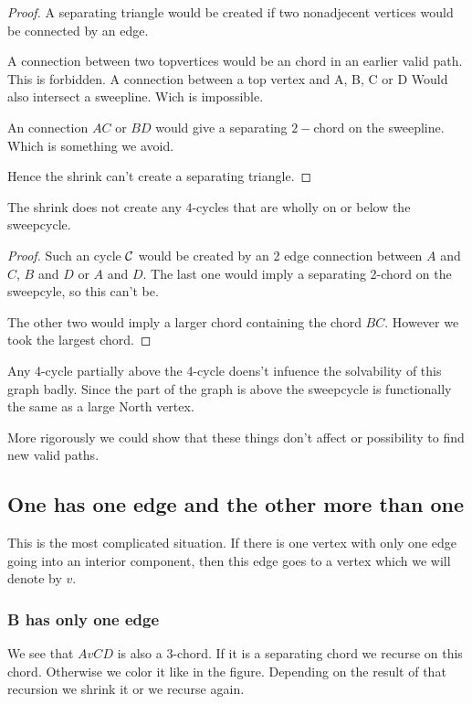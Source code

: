 \begin{proof}
  A separating triangle would be created if two nonadjecent vertices would be connected by an edge.

  A connection between two topvertices would be an chord in an earlier valid path. This is forbidden. A connection between a top vertex and A, B, C or D Would also intersect a sweepline. Wich is impossible.

  An connection $AC$ or $BD$ would give a separating $2-$chord on the sweepline. Which is something we avoid.

  Hence the shrink can't create a separating triangle.
\end{proof}



\begin{lemma}
  \label{lm:}
  The shrink does not create any $4$-cycles that are wholly on or below the sweepcycle.
\end{lemma}

\begin{proof}
  Such an cycle $\mathcal{C}$ would be created by an 2 edge connection between $A$ and $C$, $B$ and $D$ or $A$ and $D$. The last one would imply a separating 2-chord on the sweepcyle, so this can't be.

  The other two would imply a larger chord containing the chord $BC$. However we took the largest chord.
\end{proof}

Any 4-cycle partially above the 4-cycle doens't infuence the solvability of this graph badly. Since the part of the graph is above the sweepcycle is functionally the same as a large North vertex. 

More rigorously we could show that these things don't affect or possibility to find new valid paths.


\subsection{One has one edge and the other more than one}
This is the most complicated situation. If there is one vertex with only one edge going into an interior component, then this edge goes to a vertex which we will denote by $v$.

\subsubsection{B has only one edge}
We see that $AvCD$ is also a 3-chord. If it is a separating chord we recurse on this chord. Otherwise we color it like in the figure. Depending on the result of that recursion we shrink it or we recurse again.

